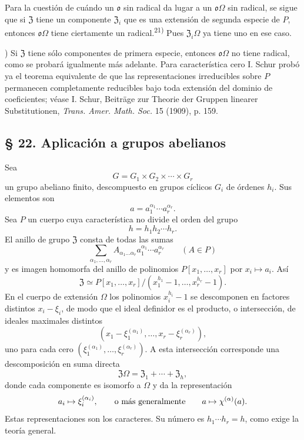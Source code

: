 \documentclass[11pt]{article}
\providecommand{\mo}{\mathfrak{o}}
\providecommand{\mZ}{\mathfrak{Z}}
\begin{document}
Para la cuestión de cuándo un $\mo$ sin radical da lugar a un $\mo\Omega$ sin radical, se sigue que si $\mZ$ tiene un componente $\mZ_i$ que es una extensión de segunda especie de $P$, entonces $\mo\Omega$ tiene ciertamente un radical.\textsuperscript{21)} Pues $\mZ_i\Omega$ ya tiene uno en ese caso.

{\footnotesize{}) Si $\mZ$ tiene sólo componentes de primera especie, entonces $\mo\Omega$ no tiene radical, como se probará igualmente más adelante. Para característica cero I. Schur probó ya el teorema equivalente de que las representaciones irreducibles sobre $P$ permanecen completamente reducibles bajo toda extensión del dominio de coeficientes; véase I. Schur, Beiträge zur Theorie der Gruppen linearer Substitutionen, \emph{Trans. Amer. Math. Soc.} 15 (1909), p. 159.\par}

\subsection*{§ 22. Aplicación a grupos abelianos}

Sea
\[
        G=G_1\times G_2\times\cdots\times G_r
\]
un grupo abeliano finito, descompuesto en grupos cíclicos $G_i$ de órdenes $h_i$. Sus elementos son
\[
        a=a_1^{\alpha_1}\cdots a_r^{\alpha_r}.
\]
Sea $P$ un cuerpo cuya característica no divide el orden del grupo
\[
        h=h_1h_2\cdots h_r.
\]
El anillo de grupo $\mZ$ consta de todas las sumas
\[
        \sum_{\alpha_1,\ldots,\alpha_r} A_{\alpha_1\ldots\alpha_r}
        a_1^{\alpha_1}\cdots a_r^{\alpha_r}
        \qquad (A\in P)
\]
y es imagen homomorfa del anillo de polinomios $P[x_1,\ldots,x_r]$ por $x_i\mapsto a_i$. Así
\[
        \mZ\simeq P[x_1,\ldots,x_r]/(x_1^{h_1}-1,\ldots,x_r^{h_r}-1).
\]
En el cuerpo de extensión $\Omega$ los polinomios $x_i^{h_i}-1$ se descomponen en factores distintos $x_i-\xi_i$, de modo que el ideal definidor es el producto, o intersección, de ideales maximales distintos
\[
        (x_1-\xi_1^{(\alpha_1)},\ldots,x_r-\xi_r^{(\alpha_r)}),
\]
uno para cada cero $(\xi_1^{(\alpha_1)},\ldots,\xi_r^{(\alpha_r)})$. A esta intersección corresponde una descomposición en suma directa
\[
        \mZ\Omega=\mZ_1+\cdots+\mZ_h,
\]
donde cada componente es isomorfo a $\Omega$ y da la representación
\[
        a_i\mapsto \xi_i^{(\alpha_i)},
        \qquad\hbox{o más generalmente}\qquad
        a\mapsto \chi^{(\alpha)}(a).
\]
Estas representaciones son los caracteres. Su número es $h_1\cdots h_r=h$, como exige la teoría general.
\end{document}
